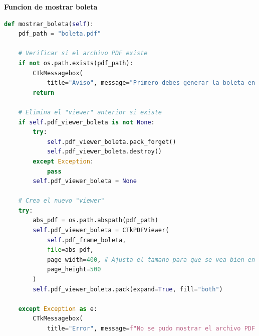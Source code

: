 \documentclass[a4paper,12pt]{article}
\begin{document}
\newpage
\textbf{Funcion de mostrar boleta}
\begin{lstlisting}[language=Python, caption={Cambio de codigo}, frame=single]
    def mostrar_boleta(self):
    pdf_path = "boleta.pdf"
    
    # Verificar si el archivo PDF existe
    if not os.path.exists(pdf_path):
        CTkMessagebox(
            title="Aviso", message="Primero debes generar la boleta en la pestana 'Pedido'.", icon="warning")
        return

    # Elimina el "viewer" anterior si existe
    if self.pdf_viewer_boleta is not None:
        try:
            self.pdf_viewer_boleta.pack_forget()
            self.pdf_viewer_boleta.destroy()
        except Exception:
            pass
        self.pdf_viewer_boleta = None
        
    # Crea el nuevo "viewer"
    try:
        abs_pdf = os.path.abspath(pdf_path)
        self.pdf_viewer_boleta = CTkPDFViewer(
            self.pdf_frame_boleta, 
            file=abs_pdf,
            page_width=400, # Ajusta el tamano para que se vea bien en el frame
            page_height=500
        )
        self.pdf_viewer_boleta.pack(expand=True, fill="both")
        
    except Exception as e:
        CTkMessagebox(
            title="Error", message=f"No se pudo mostrar el archivo PDF de la boleta.\n{e}", icon="warning")
\end{lstlisting}
\end{document}
